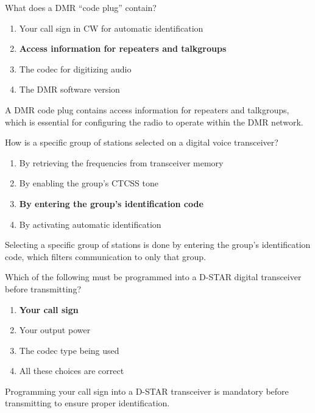 
\begin{tcolorbox}[colback=gray!10!white,colframe=black!75!black,title={T4B07}]
    What does a DMR “code plug” contain?
    \begin{enumerate}[label=\Alph*),noitemsep]
        \item Your call sign in CW for automatic identification
        \item \textbf{Access information for repeaters and talkgroups}
        \item The codec for digitizing audio
        \item The DMR software version
    \end{enumerate}
\end{tcolorbox}
A DMR code plug contains access information for repeaters and talkgroups, which is essential for configuring the radio to operate within the DMR network.


\begin{tcolorbox}[colback=gray!10!white,colframe=black!75!black,title={T4B09}]
    How is a specific group of stations selected on a digital voice transceiver?
    \begin{enumerate}[label=\Alph*),noitemsep]
        \item By retrieving the frequencies from transceiver memory
        \item By enabling the group’s CTCSS tone
        \item \textbf{By entering the group’s identification code}
        \item By activating automatic identification
    \end{enumerate}
\end{tcolorbox}
Selecting a specific group of stations is done by entering the group’s identification code, which filters communication to only that group.


\begin{tcolorbox}[colback=gray!10!white,colframe=black!75!black,title={T4B11}]
    Which of the following must be programmed into a D-STAR digital transceiver before transmitting?
    \begin{enumerate}[label=\Alph*),noitemsep]
        \item \textbf{Your call sign}
        \item Your output power
        \item The codec type being used
        \item All these choices are correct
    \end{enumerate}
\end{tcolorbox}
Programming your call sign into a D-STAR transceiver is mandatory before transmitting to ensure proper identification.

